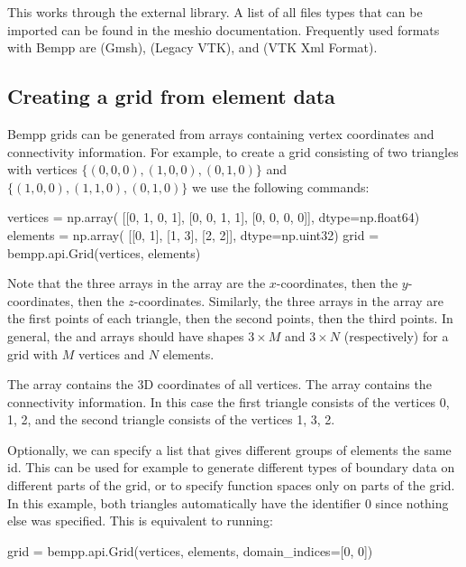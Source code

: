 \documentclass[a4paper]{book}
\begin{document}
This works through the external  library.
A list of all files types that can be imported can be found in the meshio documentation.
Frequently used formats with Bempp are  (Gmsh),
 (Legacy VTK), and  (VTK Xml Format).

\subsection{ Creating a grid from element data}Bempp grids can be generated from arrays containing vertex coordinates and
connectivity information. For example, to create a grid consisting of two
triangles with vertices $\{(0, 0, 0), (1, 0, 0), (0, 1, 0)\}$ and
$\{(1, 0, 0), (1, 1, 0), (0, 1, 0)\}$ we use the following commands:

\begin{python}
vertices = np.array(
    [[0, 1, 0, 1], [0, 0, 1, 1], [0, 0, 0, 0]],
    dtype=np.float64)
elements = np.array(
    [[0, 1], [1, 3], [2, 2]], dtype=np.uint32)
grid = bempp.api.Grid(vertices, elements)
\end{python}

Note that the three arrays in the  array are the $x$-coordinates,
then the $y$-coordinates, then the $z$-coordinates.
Similarly, the three arrays in the  array are the first points of each triangle,
then the second points, then the third points.
In general, the  and  arrays should have shapes $3\times M$ and $3\times N$
(respectively) for a grid with $M$ vertices and $N$ elements.

The array  contains the 3D coordinates of all vertices. The array
 contains the connectivity information. In this case the first
triangle consists of the vertices 0, 1, 2, and the second triangle consists
of the vertices 1, 3, 2.

Optionally, we can specify a list 
that gives different groups of elements the same id. This can be used
for example to generate different types of boundary data on different parts
of the grid, or to specify function spaces only on parts of the grid. In this
example, both triangles automatically have the identifier 0 since nothing
else was specified. This is equivalent to running:

\begin{python}
grid = bempp.api.Grid(vertices, elements, domain_indices=[0, 0])
\end{python}
\end{document}
